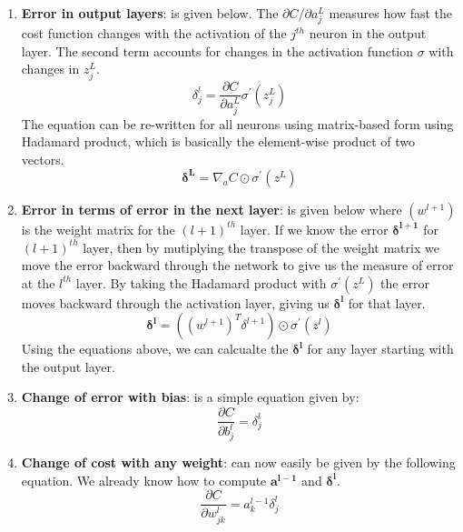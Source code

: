 \begin{enumerate}
\item \textbf{Error in output layers}: is given below. The $\partial C/\partial a_j^L$ measures how fast the cost function changes with the activation of the $j^{th}$ neuron in the output layer. The second term accounts for changes in the activation function $\sigma$ with changes in $z_j^L$.
\begin{equation}
\delta_j^l = \frac{\partial C}{\partial a_j^L}\sigma^{\prime}(z_j^L)
\end{equation}
The equation can be re-written for all neurons using matrix-based form using  Hadamard product, which is basically the element-wise product of two vectors.
\begin{equation}
\boldsymbol{\delta^L} = \nabla_a C \odot \sigma^{\prime}(z^L)
\end{equation}
\item \textbf{Error in terms of error in the next layer}: is given below where $(w^{l+1})$ is the weight matrix for the $(l+1)^{th}$ layer. If we know the error $\boldsymbol{\delta^{l+1}}$ for $(l+1)^{th}$ layer, then by mutiplying the transpose of the weight matrix we move the error backward through the network to give us the measure of error at the $l^{th}$ layer. By taking the Hadamard product with $\sigma^{\prime}(z^L)$ the error moves backward through the activation layer, giving us $\boldsymbol{\delta^l}$ for that layer.
\begin{equation}
\boldsymbol{\delta^l} = ((w^{l+1})^T \delta^{l+1})\odot \sigma^{\prime}(z^l)
\end{equation}
Using the equations above, we can calcualte the $\boldsymbol{\delta^l}$ for any layer starting with the output layer. 
\item \textbf{Change of error with bias}: is a simple equation given by:
\begin{equation}
\frac{\partial C}{\partial b_j^l} = \delta_j^l
\end{equation}
\item \textbf{Change of cost with any weight}: can now easily be given by the following equation. We already know how to compute $\boldsymbol{a^{l-1}}$ and $\boldsymbol{\delta^l}$.
\begin{equation}
\frac{\partial C}{\partial w_{jk}^l} = a^{l-1}_k \delta^l_j
\end{equation}
\end{enumerate}

